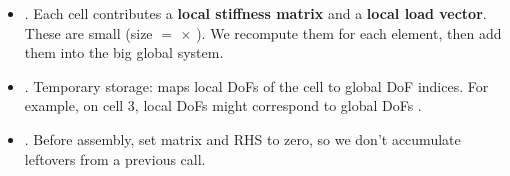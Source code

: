 \begin{itemize}
    \item {}. Each cell contributes a \textbf{local stiffness matrix} and a \textbf{local load vector}. These are small (size $=$  $\times$ ). We recompute them for each element, then add them into the big global system.
    

    \item {}. Temporary storage: maps local DoFs of the cell to global DoF indices. For example, on cell 3, local DoFs might correspond to global DoFs \code{[5, 6]}.
    

    \item {}. Before assembly, set matrix and RHS to zero, so we don't accumulate leftovers from a previous call.
\end{itemize}

